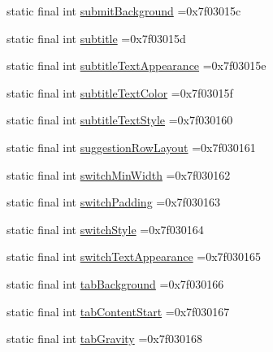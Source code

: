 \begin{DoxyCompactItemize}
\item 
static final int \mbox{\hyperlink{classcom_1_1example_1_1trainawearapplication_1_1_r_1_1attr_ae845d7e93eec450d109ae369c4fd2baf}{submit\+Background}} =0x7f03015c
\item 
static final int \mbox{\hyperlink{classcom_1_1example_1_1trainawearapplication_1_1_r_1_1attr_ae1ec416fcf580345415341ce8164f280}{subtitle}} =0x7f03015d
\item 
static final int \mbox{\hyperlink{classcom_1_1example_1_1trainawearapplication_1_1_r_1_1attr_ab1508058707d05dedc414da835bb5bef}{subtitle\+Text\+Appearance}} =0x7f03015e
\item 
static final int \mbox{\hyperlink{classcom_1_1example_1_1trainawearapplication_1_1_r_1_1attr_a214c54ff67d3c203268ac8ebbd5af3ac}{subtitle\+Text\+Color}} =0x7f03015f
\item 
static final int \mbox{\hyperlink{classcom_1_1example_1_1trainawearapplication_1_1_r_1_1attr_a84589b06b3370917f4e1ff16956ace2b}{subtitle\+Text\+Style}} =0x7f030160
\item 
static final int \mbox{\hyperlink{classcom_1_1example_1_1trainawearapplication_1_1_r_1_1attr_a6dfcfc2d7f1cfb70885927ff8c0d032e}{suggestion\+Row\+Layout}} =0x7f030161
\item 
static final int \mbox{\hyperlink{classcom_1_1example_1_1trainawearapplication_1_1_r_1_1attr_afa519be5736b8263e258b0ecc502a542}{switch\+Min\+Width}} =0x7f030162
\item 
static final int \mbox{\hyperlink{classcom_1_1example_1_1trainawearapplication_1_1_r_1_1attr_a33bedc5cd18ee85091753d00925cb870}{switch\+Padding}} =0x7f030163
\item 
static final int \mbox{\hyperlink{classcom_1_1example_1_1trainawearapplication_1_1_r_1_1attr_abeb5a29b86af04b32da7fe821d2b4c8b}{switch\+Style}} =0x7f030164
\item 
static final int \mbox{\hyperlink{classcom_1_1example_1_1trainawearapplication_1_1_r_1_1attr_afff80002ac9684ea105ae366eddf0dd7}{switch\+Text\+Appearance}} =0x7f030165
\item 
static final int \mbox{\hyperlink{classcom_1_1example_1_1trainawearapplication_1_1_r_1_1attr_a9ceb5a38bfae7a63171b32f79e0be7a3}{tab\+Background}} =0x7f030166
\item 
static final int \mbox{\hyperlink{classcom_1_1example_1_1trainawearapplication_1_1_r_1_1attr_a421d4eaaa9accf369340006562707879}{tab\+Content\+Start}} =0x7f030167
\item 
static final int \mbox{\hyperlink{classcom_1_1example_1_1trainawearapplication_1_1_r_1_1attr_ad1e0d1b9905a0b0c8fc53428f7de9e4d}{tab\+Gravity}} =0x7f030168

\end{DoxyCompactItemize}
